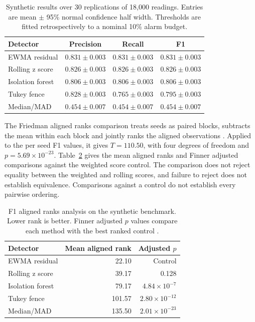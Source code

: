 \documentclass[11pt,a4paper]{article}
\begin{document}
\begin{table}[tb]\centering\small
\caption{Synthetic results over 30 replications of 18,000 readings. Entries are mean $\pm$ 95\% normal confidence half width. Thresholds are fitted retrospectively to a nominal 10\% alarm budget.}\label{tab:synthetic}
\begin{tabular}{@{}lccc@{}}\toprule
Detector & Precision & Recall & F1\\\midrule
EWMA residual & $0.831\pm0.003$ & $0.831\pm0.003$ & $0.831\pm0.003$\\
Rolling z score & $0.826\pm0.003$ & $0.826\pm0.003$ & $0.826\pm0.003$\\
Isolation forest & $0.806\pm0.003$ & $0.806\pm0.003$ & $0.806\pm0.003$\\
Tukey fence & $0.828\pm0.003$ & $0.765\pm0.003$ & $0.795\pm0.003$\\
Median/MAD & $0.454\pm0.007$ & $0.454\pm0.007$ & $0.454\pm0.007$\\\bottomrule
\end{tabular}
\end{table}

The Friedman aligned ranks comparison treats seeds as paired blocks, subtracts the mean within each block and jointly ranks the aligned observations \cite{garcia}. Applied to the per seed F1 values, it gives $T=110.50$, with four degrees of freedom and $p=5.69\times10^{-23}$. Table~\ref{tab:ranks} gives the mean aligned ranks and Finner adjusted comparisons against the weighted score control. The comparison does not reject equality between the weighted and rolling scores, and failure to reject does not establish equivalence. Comparisons against a control do not establish every pairwise ordering.

\begin{table}[tb]\centering\small
\caption{F1 aligned ranks analysis on the synthetic benchmark. Lower rank is better. Finner adjusted $p$ values compare each method with the best ranked control \cite{finner}.}\label{tab:ranks}
\begin{tabular}{@{}lrr@{}}\toprule
Detector & Mean aligned rank & Adjusted $p$\\\midrule
EWMA residual & 22.10 & Control\\
Rolling z score & 39.17 & 0.128\\
Isolation forest & 79.17 & $4.84\times10^{-7}$\\
Tukey fence & 101.57 & $2.80\times10^{-12}$\\
Median/MAD & 135.50 & $2.01\times10^{-23}$\\\bottomrule
\end{tabular}
\end{table}
\end{document}
